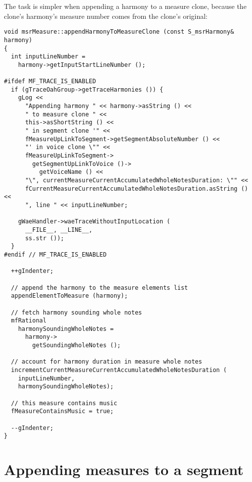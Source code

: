 The task is simpler when appending a harmony to a measure clone, because the clone's harmony's measure number comes from the clone's original:
\begin{lstlisting}[language=CPlusPlus]
void msrMeasure::appendHarmonyToMeasureClone (const S_msrHarmony& harmony)
{
  int inputLineNumber =
    harmony->getInputStartLineNumber ();

#ifdef MF_TRACE_IS_ENABLED
  if (gTraceOahGroup->getTraceHarmonies ()) {
    gLog <<
      "Appending harmony " << harmony->asString () <<
      " to measure clone " <<
      this->asShortString () <<
      " in segment clone '" <<
      fMeasureUpLinkToSegment->getSegmentAbsoluteNumber () <<
      "' in voice clone \"" <<
      fMeasureUpLinkToSegment->
        getSegmentUpLinkToVoice ()->
          getVoiceName () <<
      "\", currentMeasureCurrentAccumulatedWholeNotesDuration: \"" <<
      fCurrentMeasureCurrentAccumulatedWholeNotesDuration.asString () <<
      ", line " << inputLineNumber;

    gWaeHandler->waeTraceWithoutInputLocation (
      __FILE__, __LINE__,
      ss.str ());
  }
#endif // MF_TRACE_IS_ENABLED

  ++gIndenter;

  // append the harmony to the measure elements list
  appendElementToMeasure (harmony);

  // fetch harmony sounding whole notes
  mfRational
    harmonySoundingWholeNotes =
      harmony->
        getSoundingWholeNotes ();

  // account for harmony duration in measure whole notes
  incrementCurrentMeasureCurrentAccumulatedWholeNotesDuration (
    inputLineNumber,
    harmonySoundingWholeNotes);

  // this measure contains music
  fMeasureContainsMusic = true;

  --gIndenter;
}
\end{lstlisting}


\section{Appending measures to a segment}

